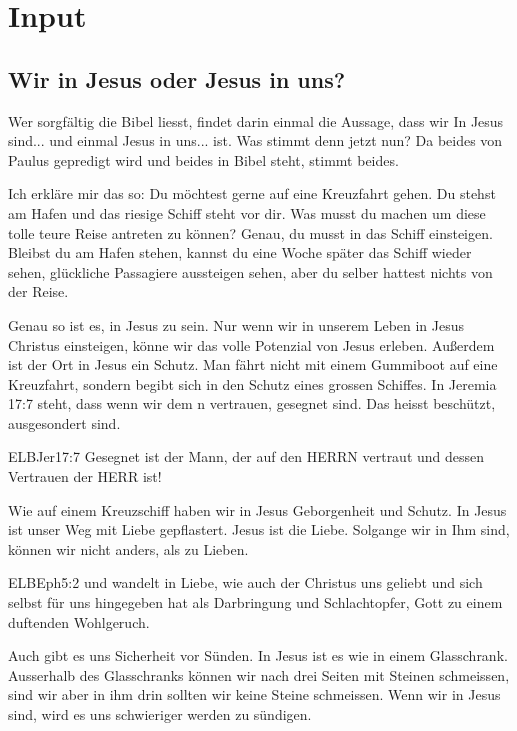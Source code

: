 \section{ Input }
\begin{spacing}{1.5}
\subsection{Wir in Jesus oder Jesus in uns?}
Wer sorgfältig die Bibel liesst, findet darin einmal die Aussage, dass wir \flqq In Jesus sind...\frqq{} und einmal \flqq Jesus in uns...\flqq{} ist. Was stimmt denn jetzt nun? Da beides von Paulus gepredigt wird und beides in Bibel steht, stimmt beides.

Ich erkläre mir das so: Du möchtest gerne auf eine Kreuzfahrt gehen. Du stehst am Hafen und das riesige Schiff steht vor dir. Was musst du machen um diese tolle teure Reise antreten zu können? Genau, du musst in das Schiff einsteigen. Bleibst du am Hafen stehen, kannst du eine Woche später das Schiff wieder sehen, glückliche Passagiere aussteigen sehen, aber du selber hattest nichts von der Reise.

Genau so ist es, in Jesus zu sein. Nur wenn wir in unserem Leben in Jesus Christus einsteigen, könne wir das volle Potenzial von Jesus erleben. Außerdem ist der Ort in Jesus ein Schutz. Man fährt nicht mit einem Gummiboot auf eine Kreuzfahrt, sondern begibt sich in den Schutz eines grossen Schiffes. In Jeremia 17:7 steht, dass wenn wir dem \herr n vertrauen, gesegnet sind. Das heisst beschützt, ausgesondert sind.
\begin{bibelbox}{ELB}{Jer}{17:7}
Gesegnet ist der Mann, der auf den HERRN vertraut und dessen Vertrauen der HERR ist! 
\end{bibelbox}
Wie auf einem Kreuzschiff haben wir in Jesus Geborgenheit und Schutz. In Jesus ist unser Weg mit Liebe gepflastert. Jesus ist die Liebe. Solgange wir in Ihm sind, können wir nicht anders, als zu Lieben.
\begin{bibelbox}{ELB}{Eph}{5:2}
und wandelt in Liebe, wie auch der Christus uns geliebt und sich selbst für uns hingegeben hat als Darbringung und Schlachtopfer, Gott zu einem duftenden Wohlgeruch.    
\end{bibelbox}
Auch gibt es uns Sicherheit vor Sünden. In Jesus ist es wie in einem Glasschrank. Ausserhalb des Glasschranks können wir nach drei Seiten mit Steinen schmeissen, sind wir aber in ihm drin sollten wir keine Steine schmeissen. Wenn wir in Jesus sind, wird es uns schwieriger werden zu sündigen.


\end{spacing}
